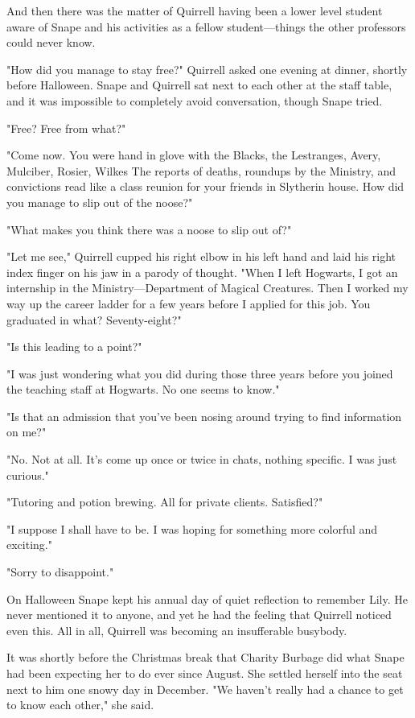 And then there was the matter of Quirrell having been a lower level student aware of Snape and his activities as a fellow student—things the other professors could never know.

"How did you manage to stay free?" Quirrell asked one evening at dinner, shortly before Halloween. Snape and Quirrell sat next to each other at the staff table, and it was impossible to completely avoid conversation, though Snape tried.

"Free? Free from what?"

"Come now. You were hand in glove with the Blacks, the Lestranges, Avery, Mulciber, Rosier, Wilkes{\el} The reports of deaths, roundups by the Ministry, and convictions read like a class reunion for your friends in Slytherin house. How did you manage to slip out of the noose?"

"What makes you think there was a noose to slip out of?"

"Let me see," Quirrell cupped his right elbow in his left hand and laid his right index finger on his jaw in a parody of thought. "When I left Hogwarts, I got an internship in the Ministry—Department of Magical Creatures. Then I worked my way up the career ladder for a few years before I applied for this job. You graduated in what? Seventy-eight?"

"Is this leading to a point?"

"I was just wondering what you did during those three years before you joined the teaching staff at Hogwarts. No one seems to know."

"Is that an admission that you've been nosing around trying to find information on me?"

"No. Not at all. It's come up once or twice in chats, nothing specific. I was just curious."

"Tutoring and potion brewing. All for private clients. Satisfied?"

"I suppose I shall have to be. I was hoping for something more colorful and exciting."

"Sorry to disappoint."

On Halloween Snape kept his annual day of quiet reflection to remember Lily. He never mentioned it to anyone, and yet he had the feeling that Quirrell noticed even this. All in all, Quirrell was becoming an insufferable busybody.

It was shortly before the Christmas break that Charity Burbage did what Snape had been expecting her to do ever since August. She settled herself into the seat next to him one snowy day in December. "We haven't really had a chance to get to know each other," she said.

